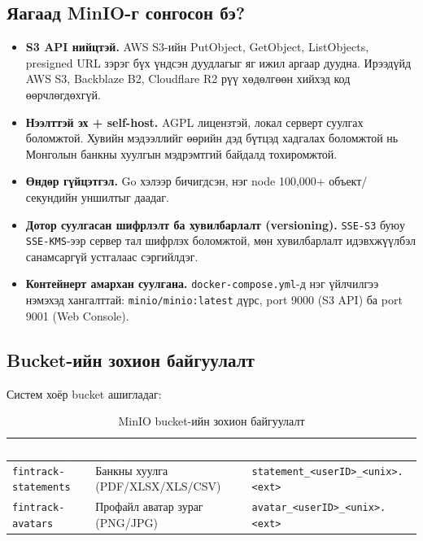 \subsection{Яагаад MinIO-г сонгосон бэ?}
\begin{itemize}
    \item \textbf{S3 API нийцтэй.} AWS S3-ийн PutObject, GetObject, ListObjects, presigned URL зэрэг бүх үндсэн дуудлагыг яг ижил аргаар дуудна. Ирээдүйд AWS S3, Backblaze B2, Cloudflare R2 рүү хөдөлгөөн хийхэд код өөрчлөгдөхгүй.
    \item \textbf{Нээлттэй эх + self-host.} AGPL лицензтэй, локал серверт суулгах боломжтой. Хувийн мэдээллийг өөрийн дэд бүтцэд хадгалах боломжтой нь Монголын банкны хуулгын мэдрэмтгий байдалд тохиромжтой.
    \item \textbf{Өндөр гүйцэтгэл.} Go хэлээр бичигдсэн, нэг node 100,000+ объект/секундийн уншилтыг даадаг.
    \item \textbf{Дотор суулгасан шифрлэлт ба хувилбарлалт (versioning).} \texttt{SSE-S3} буюу \texttt{SSE-KMS}-ээр сервер тал шифрлэх боломжтой, мөн хувилбарлалт идэвхжүүлбэл санамсаргүй устгалаас сэргийлдэг.
    \item \textbf{Контейнерт амархан суулгана.} \texttt{docker-compose.yml}-д нэг үйлчилгээ нэмэхэд хангалттай: \texttt{minio/minio:latest} дүрс, port 9000 (S3 API) ба port 9001 (Web Console).
\end{itemize}

\subsection{Bucket-ийн зохион байгуулалт}
Систем хоёр bucket ашигладаг:

\begin{table}[ht]
\centering
\footnotesize
\renewcommand{\arraystretch}{1.25}
\begin{tabular}{|p{3.5cm}|p{4cm}|p{5cm}|}
\hline
\rowcolor{darknavy}
\textcolor{white}{\textbf{Bucket нэр}} & \textcolor{white}{\textbf{Зориулалт}} & \textcolor{white}{\textbf{Файлын нэрийн загвар}} \\ \hline
\texttt{fintrack-statements}  & Банкны хуулга (PDF/XLSX/XLS/CSV)        & \texttt{statement\_<userID>\_<unix>.<ext>} \\ \hline
\texttt{fintrack-avatars}     & Профайл аватар зураг (PNG/JPG)          & \texttt{avatar\_<userID>\_<unix>.<ext>} \\ \hline
\end{tabular}
\caption{MinIO bucket-ийн зохион байгуулалт}
\label{tab:minio-buckets}
\end{table}

